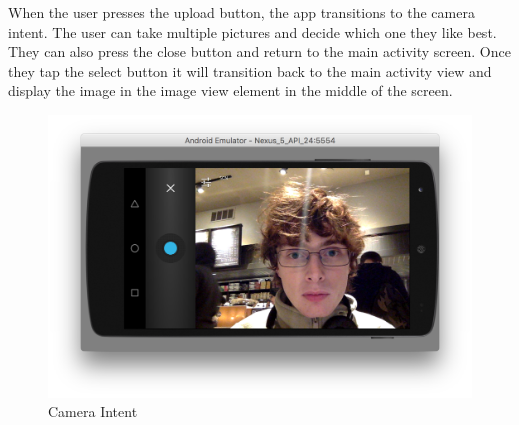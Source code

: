 \documentclass[12pt]{article}
\begin{document}
When the user presses the upload button, the app transitions to the camera intent. The user can take multiple pictures and decide which one they like best. They can also press the close button and return to the main activity screen. Once they tap the select button it will transition back to the main activity view and display the image in the image view element in the middle of the screen.
\begin{figure}[H]
    \includegraphics[scale=0.5]{./step2.png}
    \caption{Camera Intent}
\end{figure}
\end{document}
